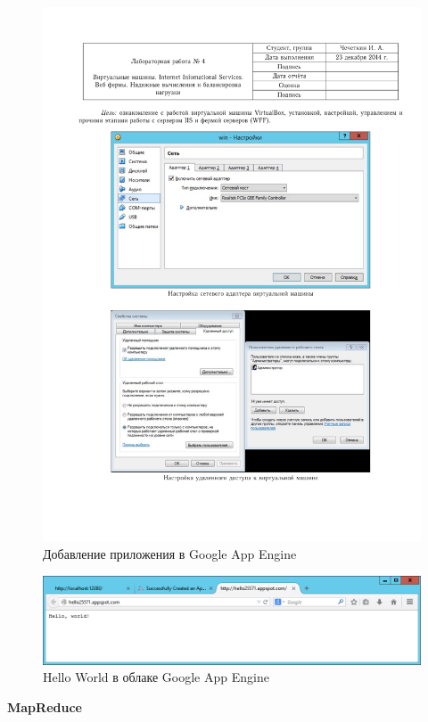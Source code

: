 \documentclass[pscyr,10pt]{hedlab}
\begin{document}
  \begin{figure}[h!]
    \center
    \includegraphics[width=.7\textwidth]{04} \\
    Добавление приложения в Google App Engine
  \end{figure}
  \vspace{-1.5em}
  \begin{figure}[h!]
    \center
    \includegraphics[width=.7\textwidth]{05} \\
    Hello World в облаке Google App Engine
  \end{figure}
  \vspace{-1em}
  
  \begin{center}
    \textbf{MapReduce}
  \end{center}
  \vspace{-1em}
  
\end{document}

